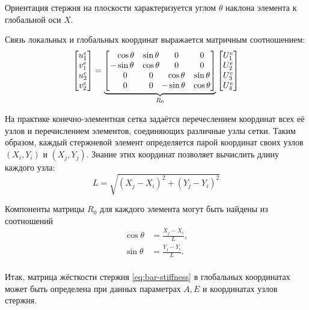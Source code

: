 \documentclass[10pt]{article}
\numberwithin{equation}{section}
\newcommand{\mm}{\llap{$-$}}
\newcommand{\phm}{\phantom{-}}
\begin{document}


Ориентация стержня на плоскости характеризуется углом $\theta$ наклона
элемента к глобальной оси $X$.

Связь локальных и глобальных координат выражается матричным
соотношением:
\begin{equation}
  \label{eq:glob-loc}
  \begin{bmatrix}
    u_1^e\\
    v_1^e\\
    u_2^e\\
    v_2^e\\
  \end{bmatrix}
  =
  \underbrace{
  \begin{bmatrix}
    \phm\cos\theta & \sin\theta & 0 & 0 \\
    -\sin\theta & \cos\theta & 0 & 0 \\
    \phm0 & 0 & \cos\theta & \sin\theta \\
    \phm0 & 0 & \mm\sin\theta & \cos\theta
  \end{bmatrix}}_{R_0}
  \begin{bmatrix}
    U_1^e\\
    U_2^e\\
    U_3^e\\
    U_4^e\\
  \end{bmatrix}
\end{equation}

На практике конечно-элементная сетка задаётся перечеслением координат
всех её узлов и перечислением элементов, соединяющих различные узлы
сетки. Таким образом, каждый стержневой элемент определяется парой
координат своих узлов $(X_i, Y_i)$ и $(X_j, Y_j)$. Знание этих
координат позволяет вычислить длину каждого узла:
\begin{equation}
  \label{eq:coord-length}
  L = \sqrt{(X_j-X_i)^2+(Y_j-Y_i)^2}
\end{equation}

Компоненты матрицы $R_0$ для каждого элемента могут быть найдены из соотношений
\begin{equation}
  \label{eq:dir-cosines}
  \begin{aligned}
    \cos\theta &= \frac{X_j-X_i}{L},\\
    \sin\theta &= \frac{Y_j-Y_i}{L}.\\
  \end{aligned}
\end{equation}

Итак, матрица жёсткости стержня \eqref{eq:bar-stiffness} в глобальных
координатах может быть определена при данных параметрах $A, E$ и
координатах узлов стержня.
\end{document}
